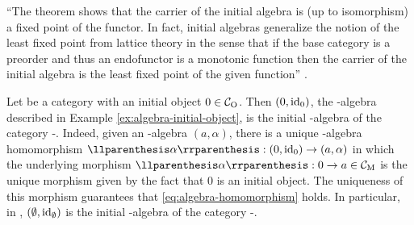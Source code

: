 ``The theorem shows that the carrier of the initial algebra is (up to
isomorphism) a fixed point of the functor. In fact, initial algebras
generalize the notion of the least fixed point from lattice theory in
the sense that if the base category is a preorder and thus an
endofunctor is a monotonic function then the carrier of the initial
algebra is the least fixed point of the given function''
\parencite[18]{vene-2000}.

\begin{example}

  \label{ex:initial-algebra-initial-object}


  Let  be a category with an initial object $0 \in \mathcal{C}_{\operatorname{O}}$.
  Then $(0,\operatorname{id}_{0})$, the -algebra described in Example
  \ref{ex:algebra-initial-object}, is the initial -algebra of
  the category -\alg. Indeed, given an -algebra
  $(a,\alpha)$, there is a unique -algebra homomorphism
  $\cata{\alpha}: (0,\idO{0}) \to (a,\alpha)$ in which the underlying
  morphism $\cata{\alpha}: 0 \to a \in \catM{C}$ is the unique
  morphism given by the fact that $0$ is an initial object. The
  uniqueness of this morphism guarantees that
  \eqref{eq:algebra-homomorphism} holds. In particular, in \set,
  $(\emptyset,\operatorname{id}_{\emptyset})$ is the initial -algebra of the
  category -\alg.

\end{example}

